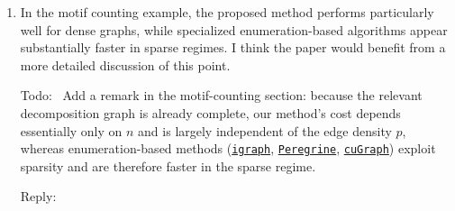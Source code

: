 \documentclass[12pt]{article}
\newenvironment{reply}{\par\smallskip\noindent\color{blue}Reply:\ \ignorespaces}{\par}
\newenvironment{todo}{\par\smallskip\noindent\color{red}Todo:\ \ignorespaces}{\par}
\newcommand{\libref}[2]{\href{#2}{\texttt{#1}}}
\theoremstyle{plain}
\theoremstyle{definition}
\def\igraph{\libref{igraph}{https://igraph.org/}}
\def\peregrine{\libref{Peregrine}{https://github.com/pdclab/peregrine}}
\def\cugraph{\libref{cuGraph}{https://docs.rapids.ai/api/cugraph/stable/}}
\begin{document}
\begin{enumerate}
\item In the motif counting example, the proposed method performs particularly well for dense graphs, while specialized enumeration-based algorithms appear substantially faster in sparse regimes. I think the paper would benefit from a more detailed discussion of this point.
\begin{todo}
    Add a remark in the motif-counting section: because the relevant decomposition graph is already complete, our method's cost depends essentially only on $n$ and is largely independent of the edge density $p$, whereas enumeration-based methods (\igraph{}, \peregrine{}, \cugraph{}) exploit sparsity and are therefore faster in the sparse regime.
\end{todo}
\begin{reply}      \end{reply}

\end{enumerate}



\end{document}
